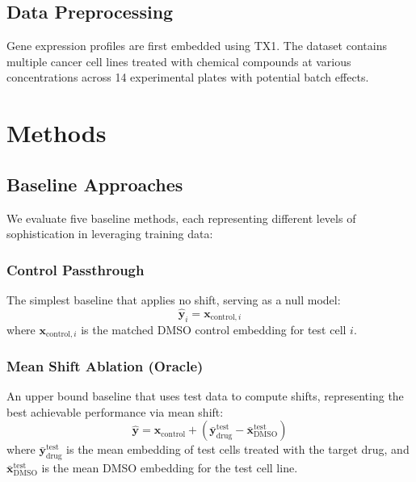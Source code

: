 \documentclass[conference]{IEEEtran}
\begin{document}
\subsection{Data Preprocessing}

Gene expression profiles are first embedded using TX1. The dataset contains multiple cancer cell lines treated with chemical compounds at various concentrations across 14 experimental plates with potential batch effects.

\section{Methods}

\subsection{Baseline Approaches}

We evaluate five baseline methods, each representing different levels of sophistication in leveraging training data:

\subsubsection{Control Passthrough}

The simplest baseline that applies no shift, serving as a null model:
\begin{equation}
\hat{\mathbf{y}}_i = \mathbf{x}_{\text{control}, i}
\end{equation}
where $\mathbf{x}_{\text{control}, i}$ is the matched DMSO control embedding for test cell $i$.

\subsubsection{Mean Shift Ablation (Oracle)}

An upper bound baseline that uses test data to compute shifts, representing the best achievable performance via mean shift:
\begin{equation}
\hat{\mathbf{y}} = \mathbf{x}_{\text{control}} + (\bar{\mathbf{y}}_{\text{drug}}^{\text{test}} - \bar{\mathbf{x}}_{\text{DMSO}}^{\text{test}})
\end{equation}
where $\bar{\mathbf{y}}_{\text{drug}}^{\text{test}}$ is the mean embedding of test cells treated with the target drug, and $\bar{\mathbf{x}}_{\text{DMSO}}^{\text{test}}$ is the mean DMSO embedding for the test cell line.
\end{document}
